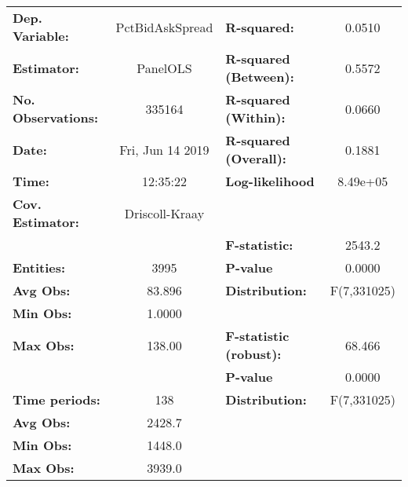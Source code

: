 \begin{center}
\begin{tabular}{lclc}
\toprule
\textbf{Dep. Variable:}                 &  PctBidAskSpread   & \textbf{  R-squared:         }   &      0.0510      \\
\textbf{Estimator:}                     &      PanelOLS      & \textbf{  R-squared (Between):}  &      0.5572      \\
\textbf{No. Observations:}              &       335164       & \textbf{  R-squared (Within):}   &      0.0660      \\
\textbf{Date:}                          &  Fri, Jun 14 2019  & \textbf{  R-squared (Overall):}  &      0.1881      \\
\textbf{Time:}                          &      12:35:22      & \textbf{  Log-likelihood     }   &     8.49e+05     \\
\textbf{Cov. Estimator:}                &   Driscoll-Kraay   & \textbf{                     }   &                  \\
\textbf{}                               &                    & \textbf{  F-statistic:       }   &      2543.2      \\
\textbf{Entities:}                      &        3995        & \textbf{  P-value            }   &      0.0000      \\
\textbf{Avg Obs:}                       &       83.896       & \textbf{  Distribution:      }   &   F(7,331025)    \\
\textbf{Min Obs:}                       &       1.0000       & \textbf{                     }   &                  \\
\textbf{Max Obs:}                       &       138.00       & \textbf{  F-statistic (robust):} &      68.466      \\
\textbf{}                               &                    & \textbf{  P-value            }   &      0.0000      \\
\textbf{Time periods:}                  &        138         & \textbf{  Distribution:      }   &   F(7,331025)    \\
\textbf{Avg Obs:}                       &       2428.7       & \textbf{                     }   &                  \\
\textbf{Min Obs:}                       &       1448.0       & \textbf{                     }   &                  \\
\textbf{Max Obs:}                       &       3939.0       & \textbf{                     }   &                  \\

\end{tabular}
\end{center}
